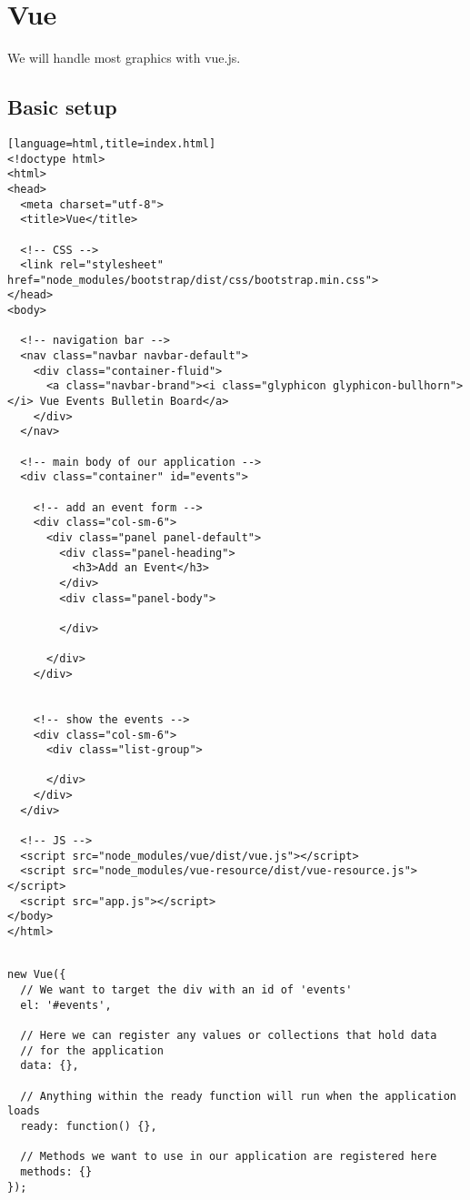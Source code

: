 \section{Vue}

We will handle most graphics with vue.js.

\subsection{Basic setup}

\begin{lstlisting}
[language=html,title=index.html]
<!doctype html>
<html>
<head>
  <meta charset="utf-8">
  <title>Vue</title>

  <!-- CSS -->
  <link rel="stylesheet" href="node_modules/bootstrap/dist/css/bootstrap.min.css">
</head>
<body>

  <!-- navigation bar -->
  <nav class="navbar navbar-default">
    <div class="container-fluid">
      <a class="navbar-brand"><i class="glyphicon glyphicon-bullhorn"></i> Vue Events Bulletin Board</a>
    </div>
  </nav>

  <!-- main body of our application -->
  <div class="container" id="events">

    <!-- add an event form -->
    <div class="col-sm-6">
      <div class="panel panel-default">
        <div class="panel-heading">
          <h3>Add an Event</h3>
        </div>
        <div class="panel-body">

        </div>

      </div>
    </div>


    <!-- show the events -->
    <div class="col-sm-6">
      <div class="list-group">

      </div>
    </div>
  </div>

  <!-- JS -->
  <script src="node_modules/vue/dist/vue.js"></script>
  <script src="node_modules/vue-resource/dist/vue-resource.js"></script>
  <script src="app.js"></script>
</body>
</html>

\end{lstlisting}

\begin{lstlisting}[title=app.js]

new Vue({
  // We want to target the div with an id of 'events'
  el: '#events',

  // Here we can register any values or collections that hold data
  // for the application
  data: {},

  // Anything within the ready function will run when the application loads
  ready: function() {},

  // Methods we want to use in our application are registered here
  methods: {}
});

\end{lstlisting}


